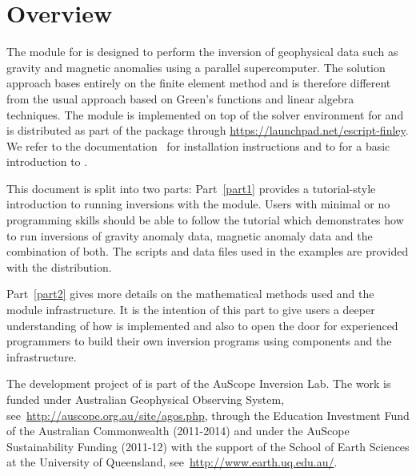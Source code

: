 
%
%
%


\chapter*{Overview}\label{sec:Intro}
The \downunder module for \python is designed to perform the inversion of
geophysical data such as gravity and magnetic anomalies using a parallel
supercomputer.
The solution approach bases entirely on the finite element method and is
therefore different from the usual approach based on Green's functions
and linear algebra techniques.
The module is implemented on top of the \escript solver environment for
\python and is distributed as part of the \escript package through
\url{https://launchpad.net/escript-finley}.
We refer to the \escript documentation~\cite{ESCRIPT} for installation
instructions and to \cite{ESCRIPTCOOKBOOK} for a basic introduction to \escript.

This document is split into two parts:
Part~\ref{part1} provides a tutorial-style introduction to running inversions
with the \downunder module.
Users with minimal or no programming skills should be able to follow the
tutorial which demonstrates how to run inversions of gravity anomaly data,
magnetic anomaly data and the combination of both.
The scripts and data files used in the examples are provided with the \escript
distribution.

Part~\ref{part2} gives more details on the mathematical methods used and the
module infrastructure.
It is the intention of this part to give users a deeper understanding of how
\downunder is implemented and also to open the door for experienced \python
programmers to build their own inversion programs using \downunder components
and the \escript infrastructure. 

The development project of \downunder is part of the AuScope Inversion Lab. The work is funded 
under Australian Geophysical Observing System, 
see~\url{http://auscope.org.au/site/agos.php}, through the Education Investment Fund of
the Australian Commonwealth (2011-2014) and under the AuScope Sustainability Funding (2011-12)
with the support of the School of Earth Sciences at the University of Queensland, see~\url{http://www.earth.uq.edu.au/}.
